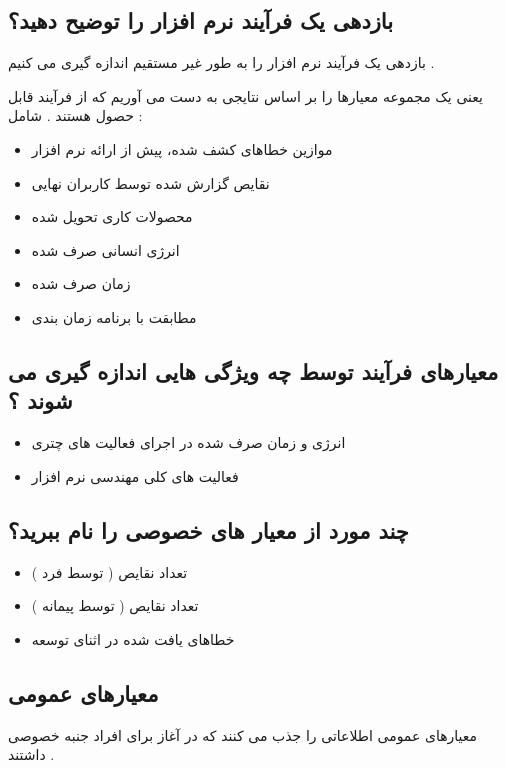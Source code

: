 \documentclass{article}
\begin{document}
\newpage

\subsection{بازدهی یک فرآیند نرم افزار را توضیح دهید؟}
بازدهی یک فرآیند نرم افزار را به طور غیر مستقیم اندازه گیری می کنیم .

یعنی یک مجموعه معیارها را بر اساس نتایجی به دست می آوریم که از فرآیند قابل حصول هستند . شامل :

\begin{itemize}
	\item موازین خطاهای کشف شده، پیش از ارائه نرم افزار
	\item نقایص گزارش شده توسط کاربران نهایی
	\item محصولات کاری تحویل شده
	\item انرژی انسانی صرف شده
	\item زمان صرف شده
	\item مطابقت با برنامه زمان بندی
\end{itemize}



\subsection{معیارهای فرآیند توسط چه ویژگی هایی اندازه گیری می شوند ؟}

\begin{itemize}
	\item انرژی و زمان صرف شده در اجرای فعالیت های چتری
	\item فعالیت های کلی مهندسی نرم افزار
\end{itemize}



\subsection{چند مورد از معیار های خصوصی را نام ببرید؟}

\begin{itemize}
	\item تعداد نقایص ( توسط فرد )
	\item تعداد نقایص ( توسط پیمانه )
	\item خطاهای یافت شده در اثنای توسعه
\end{itemize}

\subsection{معیارهای عمومی}
معیارهای عمومی اطلاعاتی را جذب می کنند که در آغاز برای افراد جنبه خصوصی داشتند .
\end{document}
